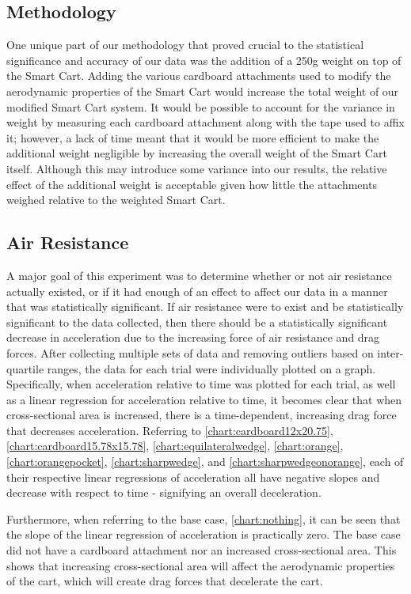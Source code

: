 \subsection{Methodology}
One unique part of our methodology that proved crucial to the statistical
significance and accuracy of our data was the addition of a 250g weight on top of the
Smart Cart. Adding the various cardboard attachments used to modify the aerodynamic properties of the
Smart Cart would increase the total weight of our modified Smart Cart system. It would be possible to
account for the variance in weight by measuring each cardboard attachment along with the tape used to
affix it; however, a lack of time meant that it would be more efficient to make the additional weight
negligible by increasing the overall weight of the Smart Cart itself. Although this may introduce some
variance into our results, the relative effect of the additional weight is acceptable given how little
the attachments weighed relative to the weighted Smart Cart.

\subsection{Air Resistance}
A major goal of this experiment was to determine whether or not air resistance actually existed, or if 
it had enough of an effect to affect our data in a manner that was statistically significant. If air resistance
were to exist and be statistically significant to the data collected, then there should be a statistically significant
decrease in acceleration due to the increasing force of air resistance and drag forces. After collecting multiple sets of
data and removing outliers based on inter-quartile ranges, the data for each trial were individually plotted on a graph.
Specifically, when acceleration relative to time was plotted for each trial, as well as a linear regression for acceleration relative to time,
it becomes clear that when cross-sectional area is increased, there is a time-dependent, increasing drag force that decreases acceleration.
Referring to \ref{chart:cardboard12x20.75}, \ref{chart:cardboard15.78x15.78}, \ref{chart:equilateralwedge}, \ref{chart:orange}, \ref{chart:orangepocket}, \ref{chart:sharpwedge}, and \ref{chart:sharpwedgeonorange},
each of their respective linear regressions of acceleration all have negative slopes and decrease with respect to time - signifying an overall deceleration.

Furthermore, when referring to the base case, \ref{chart:nothing}, it can be seen that the slope of the linear regression of acceleration is
practically zero. The base case did not have a cardboard attachment nor an increased cross-sectional area.
This shows that increasing cross-sectional area will affect the aerodynamic properties of the cart,
which will create drag forces that decelerate the cart.